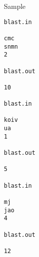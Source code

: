 Sample
\begin{verbatim}
blast.in 
 
cmc 
snmn 
2 
 
blast.out 
 
10 

blast.in 
 
koiv 
ua 
1 
 
blast.out 
 
5

blast.in 
 
mj 
jao 
4 
 
blast.out 
 
12 

\end{verbatim}